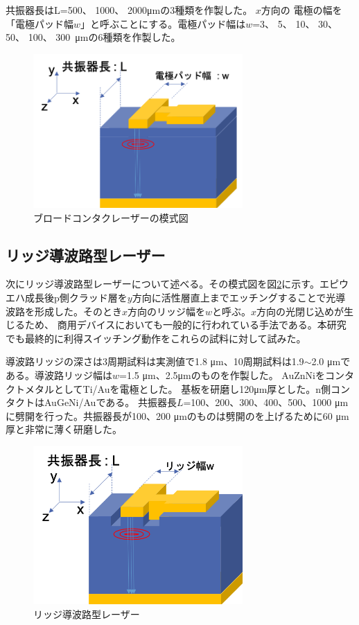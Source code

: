 共振器長はL=500、 1000、 2000\si{ \micro\metre}の3種類を作製した。
$x$方向の
電極の幅を「電極パッド幅$w$」と呼ぶことにする。電極パッド幅は$w$=3、 5、 10、 30、 50、 100、 300\ \si{ \micro\metre}の6種類を作製した。

\begin{figure}[h]
	\centering
	\includegraphics[width=8cm]{figure/fig_2_1_broadcontact.png}
	\caption{ブロードコンタクレーザーの模式図}
	\label{fig:sample_broadcontact}
\end{figure}

\subsection{リッジ導波路型レーザー}%
次にリッジ導波路型レーザーについて述べる。その模式図を図\ref{fig_2_1_ridge}に示す。エピウエハ成長後p側クラッド層を$y$方向に活性層直上までエッチングすることで光導波路を形成した。そのとき$x$方向のリッジ幅を$w$と呼ぶ。$x$方向の光閉じ込めが生じるため、%
商用デバイスにおいても一般的に行われている手法である。本研究でも最終的に利得スイッチング動作をこれらの試料に対して試みた。

導波路リッジの深さは3周期試料は実測値で1.8 \si{\micro\metre}、10周期試料は1.9$\sim$2.0 \si{\micro\metre}である。導波路リッジ幅は$w$=1.5 \si{\micro\metre}、2.5\si{\micro\metre}のものを作製した。
AuZnNiをコンタクトメタルとしてTi/Auを電極とした。
基板を研磨し120\si{ \micro\metre}厚とした。n側コンタクトはAuGeNi/Auである。
共振器長$L$=100、200、300、400、500、1000 \si{ \micro\metre}に劈開を行った。共振器長が100、200  \si{ \micro\metre}のものは劈開のを上げるために60 \si{ \micro\metre}厚と非常に薄く研磨した。
\begin{figure}[h]
	\centering
	\includegraphics[width=8cm]{figure/fig_2_1_ridge.png}
	\caption{リッジ導波路型レーザー}
	\label{fig_2_1_ridge}
\end{figure}

